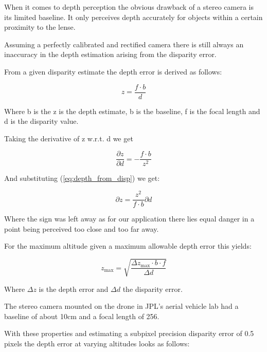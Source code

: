 When it comes to depth perception the obvious drawback of a stereo camera is its limited baseline. It only perceives depth accurately for objects within a certain proximity to the lense. 

Assuming a perfectly calibrated and rectified camera there is still always an inaccuracy in the depth estimation arising from the disparity error.

From a given disparity estimate the depth error is derived as follows:

\begin{equation}\label{eq:depth_from_disp}
    z = \frac{f \cdot b}{d}
\end{equation}

Where b is the z is the depth estimate, b is the baseline, f is the focal length and d is the disparity value.

Taking the derivative of z w.r.t. d we get

\begin{equation}
    \frac{\partial z}{\partial d} = - \frac{f  \cdot b}{z^2}
\end{equation}

And substituting (\cref{eq:depth_from_disp}) we get:

\begin{equation}
    {\partial z} = \frac{z^2}{f  \cdot b}\partial d
\end{equation}

Where the sign was left away as for our application there lies equal danger in a point being perceived too close and too far away.

For the maximum altitude given a maximum allowable depth error this yields:

\begin{equation}
    z_{\text{max}} = \sqrt{\frac{\Delta z_{\text{max}} \cdot b \cdot f}{\Delta d}}
\end{equation}

Where $\Delta z$ is the depth error and $\Delta d$ the disparity error.

The stereo camera mounted on the drone in JPL's aerial vehicle lab had a baseline of about 10cm and a focal length of 256.

With these properties and estimating a subpixel precision disparity error of 0.5 pixels the depth error at varying altitudes looks as follows:

